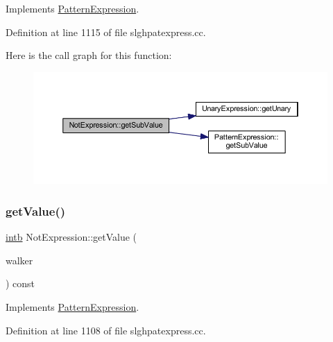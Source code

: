Implements \mbox{\hyperlink{class_pattern_expression_ade37db4aa76dd442b189bf4a6bb2d9dd}{Pattern\+Expression}}.



Definition at line 1115 of file slghpatexpress.\+cc.

Here is the call graph for this function\+:
\nopagebreak
\begin{figure}[H]
\begin{center}
\leavevmode
\includegraphics[width=350pt]{class_not_expression_adcb19bdd1315934c96daabebf3010175_cgraph}
\end{center}
\end{figure}
\mbox{\label{class_not_expression_a6122ccadabed688967cfa502d76d4b31}} 
\subsubsection{\texorpdfstring{getValue()}{getValue()}}
{\footnotesize\ttfamily \mbox{\hyperlink{types_8h_aa925ba3e627c2df89d5b1cfe84fb8572}{intb}} Not\+Expression\+::get\+Value (\begin{DoxyParamCaption}\item[{\mbox{\hyperlink{class_parser_walker}{Parser\+Walker}} \&}]{walker }\end{DoxyParamCaption}) const\hspace{0.3cm}{\ttfamily [virtual]}}



Implements \mbox{\hyperlink{class_pattern_expression_a8332c6ea4c5a7e9dfc690df2a6458bb8}{Pattern\+Expression}}.



Definition at line 1108 of file slghpatexpress.\+cc.

